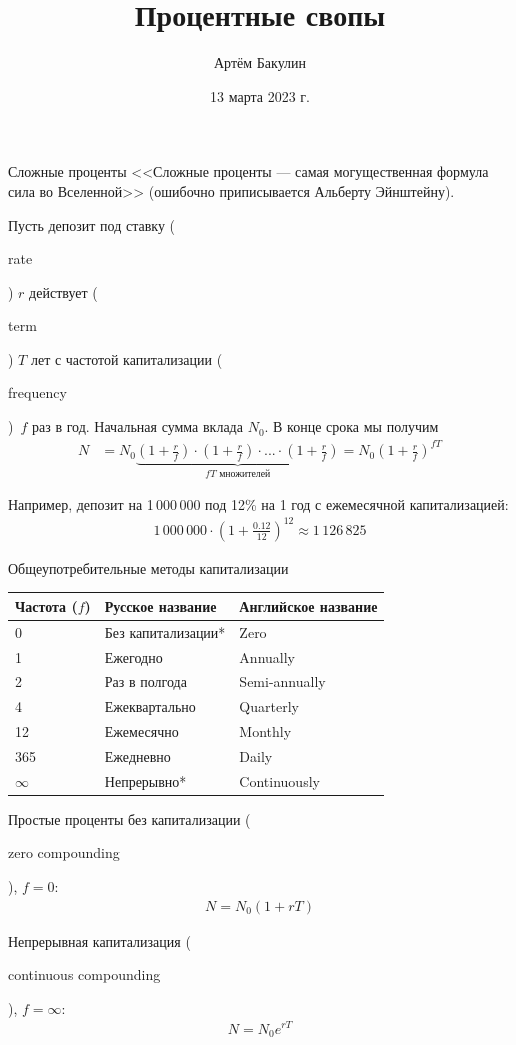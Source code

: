\documentclass{beamer}
\title{Процентные свопы}
\author{Артём Бакулин}
\date{13 марта 2023 г.}
\newcommand{\en}[1]{\begin{otherlanguage}{english}#1\end{otherlanguage}}
\begin{document}
\begin{frame}
\titlepage
\end{frame}

\begin{frame}{Сложные проценты}
\justify
<<Сложные проценты --- самая могущественная формула сила во Вселенной>> 
(ошибочно приписывается Альберту Эйнштейну).

\justify
Пусть депозит под ставку (\en{rate}) $r$ действует (\en{term}) $T$ лет с 
частотой капитализации (\en{frequency})\ $f$ раз в год. Начальная сумма вклада 
$N_0$. В конце срока мы получим
\begin{align*}
N &= N_0\underbrace{\left(1 + \frac{r}{f}\right) \cdot \left(1 + \frac{r}{f}\right) \cdot ... \cdot \left(1 + \frac{r}{f}\right)}_{fT \text{\ множителей}} = 
N_0\left(1 + \frac{r}{f}\right)^{fT}
\end{align*}

Например, депозит на 1\,000\,000 под 12\% на 1 год с ежемесячной капитализацией:
\begin{align*}
1\,000\,000 \cdot \left(1 + \frac{0.12}{12}\right)^{12} \approx 1\,126\,825
\end{align*}
\end{frame}



\begin{frame}{Общеупотребительные методы капитализации}
\centering
\begin{tabular}{l|l|l}
Частота ($f$) & Русское название & Английское название \\ \hline 
0 & Без капитализации* & Zero \\
1 & Ежегодно & Annually \\
2 & Раз в полгода & Semi-annually \\
4 & Ежеквартально & Quarterly \\
12 & Ежемесячно & Monthly \\
365 & Ежедневно & Daily \\
$\infty$ & Непрерывно* & Continuously 
\end{tabular}

\justify
Простые проценты без капитализации (\en{zero compounding}), $f=0$:
\begin{align*}
N = N_0 (1 + rT)
\end{align*}

Непрерывная капитализация (\en{continuous compounding}), $f=\infty$:
\begin{align*}
N = N_0e^{rT}
\end{align*}
\end{frame}
\end{document}
